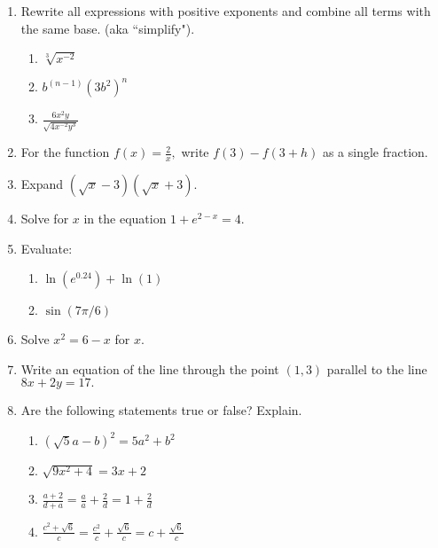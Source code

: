 \documentclass[11pt,fleqn]{article}
\begin{document}
\renewcommand{\headrulewidth}{0pt}
\newcommand{\blank}[1]{\rule{#1}{0.75pt}}
\renewcommand{\d}{\displaystyle}


\vspace*{-0.7in}
\begin{center}
  \large {}
\end{center}
\begin{enumerate}
\item Rewrite all expressions with positive exponents and combine all terms with the same base. (aka ``simplify").

	\begin{enumerate}
	\item $\sqrt[3]{x^{-2}}$\\
	\vspace{.5in}
	
	\item $b^{(n-1)}(3b^2)^n$\\ \vspace{.5in}
	
	\item $\frac{6x^2y}{\sqrt{4x^{-2}y^3}}$\\ \vspace{.5in}
	\end{enumerate} 
	
\item For the function $f(x)=\frac{2}{x},$ write $f(3)-f(3+h)$ as a single fraction.
\vfill
\item Expand $(\sqrt{x}-3)(\sqrt{x}+3)$.
\vfill
\item Solve for $x$ in the equation $1+e^{2-x}=4.$
\vfill
\newpage


\item Evaluate:
	\begin{enumerate}
	\item $\ln (e^{0.24}) + \ln (1)$\\
	\item $\sin(7\pi/6)$\\
	\end{enumerate}
	
\item Solve $x^2=6-x$ for $x.$
\vfill
\item Write an equation of the line through the point $(1,3)$ parallel to the line $8x+2y=17.$
\vfill
\item Are the following statements true or false? Explain.

  \begin{enumerate}[label=\alph*.]
  \item $(\sqrt{5}a-b)^2 = 5a^2 + b^2$ \vskip0.25in
  \item $\sqrt{9x^2 + 4} =3 x + 2$ \vskip0.25in
  \item $\d \frac{a+2}{d+a} = \frac a a + \frac 2 d =1+ \frac 2 d$ \vskip0.25in
  \item $\d \frac{c^2+ \sqrt{6}}{c} = \frac{c^2}{ c} + \frac{\sqrt{6}}{ c }= c + \frac{\sqrt{6}}{ c }$ \vskip0.25in
  \end{enumerate}
\newpage


\end{enumerate}
\end{document}
